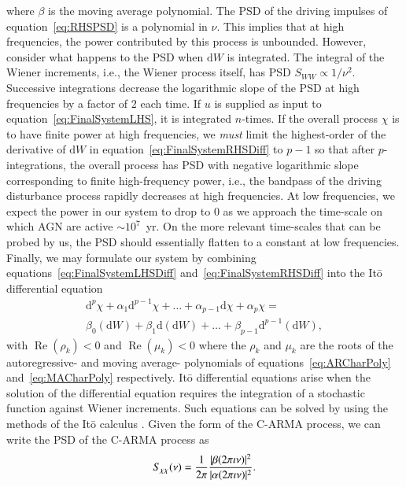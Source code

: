 \documentclass[a4paper,fleqn,usenatbib]{mnras}
\begin{document}
where $\beta$ is the moving average polynomial. The PSD of the driving impulses of equation~\eqref{eq:RHSPSD} is a polynomial in $\nu$. This implies that at high frequencies, the power contributed by this process is unbounded. However, consider what happens to the PSD when $\mathrm{d}W$ is integrated. The integral of the Wiener increments, i.e., the Wiener process itself, has PSD $S_{WW} \propto 1/\nu^{2}$. Successive integrations decrease the logarithmic slope of the PSD at high frequencies by a factor of $2$ each time. If $u$ is supplied as input to equation~\eqref{eq:FinalSystemLHS}, it is integrated $n$-times. If the overall process $\chi$ is to have finite power at high frequencies, we \textit{must} limit the highest-order of the derivative of $\mathrm{d}W$ in equation~\eqref{eq:FinalSystemRHSDiff} to $p-1$ so that after $p$-integrations, the overall process has PSD with negative logarithmic slope corresponding to finite high-frequency power, i.e., the bandpass of the driving disturbance process rapidly decreases at high frequencies. At low frequencies, we expect the power in our system to drop to $0$ as we approach the time-scale on which AGN are active $\sim 10^{7}$~yr. On the more relevant time-scales that can be probed by us, the PSD should essentially flatten to a constant at low frequencies. Finally, we may formulate our system by combining equations~\eqref{eq:FinalSystemLHSDiff} and~\eqref{eq:FinalSystemRHSDiff} into the It\={o} differential equation
\begin{multline}\label{eq:CARMA}
\mathrm{d}^{p}\chi + \alpha_{1} \mathrm{d}^{p-1}\chi + \ldots + \alpha_{p-1} \mathrm{d}\chi + \alpha_{p} \chi = \\ \beta_{0} (\mathrm{d}W) + \beta_{1} \mathrm{d}(\mathrm{d}W) + \ldots + \beta_{p-1} \mathrm{d}^{p-1}(\mathrm{d}W),
\end{multline}
with $\operatorname{Re}(\rho_{k}) < 0$ and $\operatorname{Re}(\mu_{k}) < 0$ where the $\rho_{k}$ and $\mu_{k}$ are the roots of the autoregressive- and moving average- polynomials of equations~\eqref{eq:ARCharPoly} and~\eqref{eq:MACharPoly} respectively. It\={o} differential equations arise when the solution of the differential equation requires the integration of a stochastic function against Wiener increments. Such equations can be solved by using the methods of the It\={o} calculus \citep{Oksendal}. Given the form of the C-ARMA process, we can write the PSD of the C-ARMA process \citep{HandbookOfStatistics19Brockwell} as 
\begin{equation}\label{eq:CARMAPSD}
S_{\chi\chi}(\nu) = \frac{1}{2 \pi }\frac{|\beta(2 \pi \imath \nu)|^{2}}{|\alpha(2 \pi \imath \nu)|^{2}}.
\end{equation}
\end{document}
